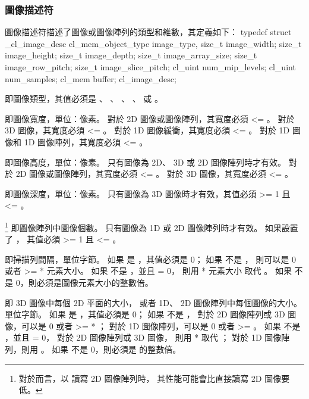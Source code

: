 \subsubsection[sec:imgDsc]{圖像描述符}

圖像描述符描述了圖像或圖像陣列的類型和維數，其定義如下：
\startclc
typedef struct _cl_image_desc {
	cl_mem_object_type	image_type,
	size_t			image_width;
	size_t			image_height;
	size_t			image_depth;
	size_t			image_array_size;
	size_t			image_row_pitch;
	size_t			image_slice_pitch;
	cl_uint			num_mip_levels;
	cl_uint			num_samples;
	cl_mem			buffer;
} cl_image_desc;
\stopclc

 即圖像類型，其值必須是 、
、 、
、 
或 。

 即圖像寬度，單位：像素。
對於 2D 圖像或圖像陣列，其寬度必須 <= 。
對於 3D 圖像，其寬度必須 <= 。
對於 1D 圖像緩衝，其寬度必須 <= 。
對於 1D 圖像和 1D 圖像陣列，其寬度必須 <= 。

 即圖像高度，單位：像素。
只有圖像為 2D、 3D 或 2D 圖像陣列時才有效。
對於 2D 圖像或圖像陣列，其寬度必須 <= 。
對於 3D 圖像，其寬度必須 <= 。

 即圖像深度，單位：像素。
只有圖像為 3D 圖像時才有效，其值必須 >= 1 且 <= 。

\footnote{%
對於而言，以  讀寫 2D 圖像陣列時，
其性能可能會比直接讀寫 2D 圖像要低。%
} 即圖像陣列中圖像個數。
只有圖像為 1D 或 2D 圖像陣列時才有效。
如果設置了 ，
其值必須 >= 1 且 <= 。

 即掃描列間隔，單位字節。
如果  是 ，其值必須是 0；
如果  不是 ，
則可以是 0 或者 >=  * 元素大小。
如果  不是 ，並且  = 0，
則用  * 元素大小 取代 。
如果  不是 0，則必須是圖像元素大小的整數倍。

 即 3D 圖像中每個 2D 平面的大小，
或者 1D、 2D 圖像陣列中每個圖像的大小。單位字節。
如果  是 ，其值必須是 0；
如果  不是 ，
對於 2D 圖像陣列或 3D 圖像，可以是 0 或者 >=  * ；
對於 1D 圖像陣列，可以是 0 或者 >= 。
如果  不是 ，並且  = 0，
對於 2D 圖像陣列或 3D 圖像，
則用  *  取代 ；
對於 1D 圖像陣列，則用 。
如果  不是 0，則必須是  的整數倍。

